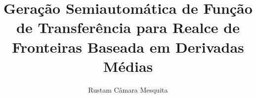\documentclass[
master,
brazilian
]{ThesisPUC}
\author{Rustam Câmara Mesquita}
\title{Geração Semiautomática de Função de Transferência para Realce de Fronteiras Baseada em Derivadas Médias}
\begin{document}
%  






  \arial
  
  \normalfont
%  
\end{document}
